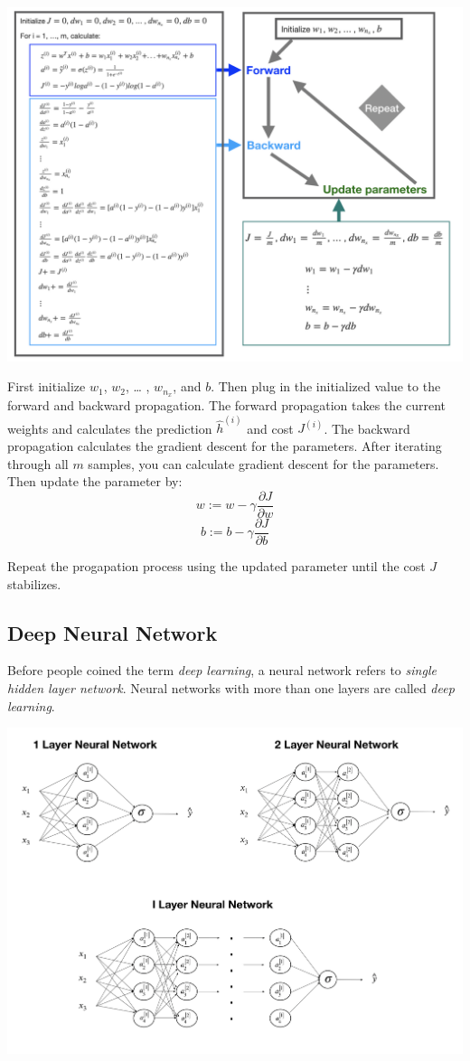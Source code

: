 \documentclass[12pt,]{krantz}
\theoremstyle{definition}
\theoremstyle{definition}
\theoremstyle{definition}
\theoremstyle{remark}
\begin{document}
\includegraphics[width=1.00000\textwidth]{images/GradientDescent.png}

First initialize \(w_1\), \(w_2\), \ldots{} , \(w_{n_x}\), and \(b\).
Then plug in the initialized value to the forward and backward
propagation. The forward propagation takes the current weights and
calculates the prediction \(\hat{h}^{(i)}\) and cost \(J^{(i)}\). The
backward propagation calculates the gradient descent for the parameters.
After iterating through all \(m\) samples, you can calculate gradient
descent for the parameters. Then update the parameter by:
\[w := w - \gamma \frac{\partial J}{\partial w}\]
\[b := b - \gamma \frac{\partial J}{\partial b}\]

Repeat the progapation process using the updated parameter until the
cost \(J\) stabilizes.

\subsection{Deep Neural Network}\label{deep-neural-network}

Before people coined the term \emph{deep learning}, a neural network
refers to \emph{single hidden layer network}. Neural networks with more
than one layers are called \emph{deep learning}.

\includegraphics{images/dnn_str.png}
\end{document}
